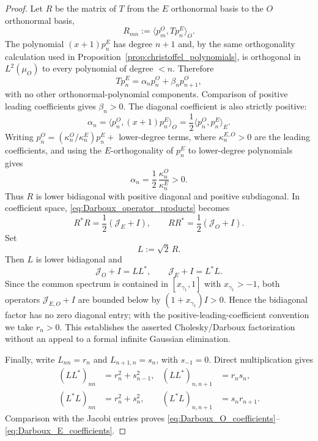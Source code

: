 \documentclass[11pt]{amsart}
\numberwithin{equation}{section}
\theoremstyle{plain}
\theoremstyle{definition}
\theoremstyle{remark}
\begin{document}
\begin{proof}
Let $R$ be the matrix of $T$ from the $E$ orthonormal basis to the $O$ orthonormal basis,
\begin{equation}
R_{mn}:=\langle p_m^O,Tp_n^E\rangle_O.
\end{equation}
The polynomial $(x+1)p_n^E$ has degree $n+1$ and, by the same orthogonality calculation used in Proposition~\ref{prop:christoffel_polynomials}, is orthogonal in $L^2(\mu_O)$ to every polynomial of degree $<n$.  Therefore
\begin{equation}
Tp_n^E=\alpha_n p_n^O+\beta_n p_{n+1}^O,
\end{equation}
with no other orthonormal-polynomial components.  Comparison of positive leading coefficients gives \(\beta_n>0\).  The diagonal coefficient is also strictly positive:
\[
\alpha_n
=\langle p_n^O,(x+1)p_n^E\rangle_O
=\frac12\langle p_n^O,p_n^E\rangle_E.
\]
Writing \(p_n^O=(\kappa_n^O/\kappa_n^E)p_n^E+\) lower-degree terms, where
\(\kappa_n^{E,O}>0\) are the leading coefficients, and using the \(E\)-orthogonality
of \(p_n^E\) to lower-degree polynomials gives
\[
\alpha_n=\frac12\,\frac{\kappa_n^O}{\kappa_n^E}>0.
\]
Thus \(R\) is lower bidiagonal with positive diagonal and positive subdiagonal.  In coefficient space, \eqref{eq:Darboux_operator_products} becomes
\begin{equation}
R^*R=\frac12(\mathcal J_E+I),
\qquad
RR^*=\frac12(\mathcal J_O+I).
\end{equation}
Set
\begin{equation}
L:=\sqrt2\,R.
\end{equation}
Then $L$ is lower bidiagonal and
\begin{equation}
\mathcal J_O+I=LL^*,
\qquad
\mathcal J_E+I=L^*L.
\end{equation}
Since the common spectrum is contained in $[x_{\gamma_1},1]$ with $x_{\gamma_1}>-1$, both operators $\mathcal J_{E,O}+I$ are bounded below by $(1+x_{\gamma_1})I>0$.  Hence the bidiagonal factor has no zero diagonal entry; with the positive-leading-coefficient convention we take $r_n>0$.  This establishes the asserted Cholesky/Darboux factorization without an appeal to a formal infinite Gaussian elimination.

Finally, write $L_{nn}=r_n$ and $L_{n+1,n}=s_n$, with $s_{-1}=0$.  Direct multiplication gives
\begin{align}
(LL^*)_{nn}&=r_n^2+s_{n-1}^2,
&(LL^*)_{n,n+1}&=r_ns_n,\\
(L^*L)_{nn}&=r_n^2+s_n^2,
&(L^*L)_{n,n+1}&=s_nr_{n+1}.
\end{align}
Comparison with the Jacobi entries proves \eqref{eq:Darboux_O_coefficients}--\eqref{eq:Darboux_E_coefficients}.
\end{proof}
\end{document}
